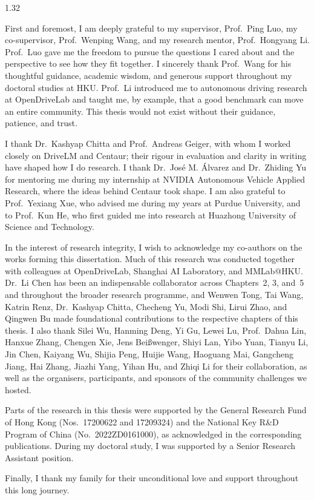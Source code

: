 \begin{acknowledgements}
\begin{spacing}{1.32}

First and foremost, I am deeply grateful to my supervisor, Prof.~Ping Luo, my co-supervisor, Prof.~Wenping Wang, and my research mentor, Prof.~Hongyang Li. Prof.~Luo gave me the freedom to pursue the questions I cared about and the perspective to see how they fit together. I sincerely thank Prof.~Wang for his thoughtful guidance, academic wisdom, and generous support throughout my doctoral studies at HKU. Prof.~Li introduced me to autonomous driving research at OpenDriveLab and taught me, by example, that a good benchmark can move an entire community. This thesis would not exist without their guidance, patience, and trust.

I thank Dr.~Kashyap Chitta and Prof.~Andreas Geiger, with whom I worked closely on DriveLM and Centaur; their rigour in evaluation and clarity in writing have shaped how I do research. I thank Dr.~Jos\'e M. \'Alvarez and Dr.~Zhiding Yu for mentoring me during my internship at NVIDIA Autonomous Vehicle Applied Research, where the ideas behind Centaur took shape. I am also grateful to Prof.~Yexiang Xue, who advised me during my years at Purdue University, and to Prof.~Kun He, who first guided me into research at Huazhong University of Science and Technology.

In the interest of research integrity, I wish to acknowledge my co-authors on the works forming this dissertation. Much of this research was conducted together with colleagues at OpenDriveLab, Shanghai AI Laboratory, and MMLab@HKU. Dr.~Li Chen has been an indispensable collaborator across Chapters~2, 3, and~5 and throughout the broader research programme, and Wenwen Tong, Tai Wang, Katrin Renz, Dr.~Kashyap Chitta, Checheng Yu, Modi Shi, Lirui Zhao, and Qingwen Bu made foundational contributions to the respective chapters of this thesis. I also thank Silei Wu, Hanming Deng, Yi Gu, Lewei Lu, Prof.~Dahua Lin, Hanxue Zhang, Chengen Xie, Jens Bei{\ss}wenger, Shiyi Lan, Yibo Yuan, Tianyu Li, Jin Chen, Kaiyang Wu, Shijia Peng, Huijie Wang, Haoguang Mai, Gangcheng Jiang, Hai Zhang, Jiazhi Yang, Yihan Hu, and Zhiqi Li for their collaboration, as well as the organisers, participants, and sponsors of the community challenges we hosted.

Parts of the research in this thesis were supported by the General Research Fund of Hong Kong (Nos.~17200622 and 17209324) and the National Key R\&D Program of China (No.~2022ZD0161000), as acknowledged in the corresponding publications. During my doctoral study, I was supported by a Senior Research Assistant position.

Finally, I thank my family for their unconditional love and support throughout this long journey.

\end{spacing}
\end{acknowledgements}
